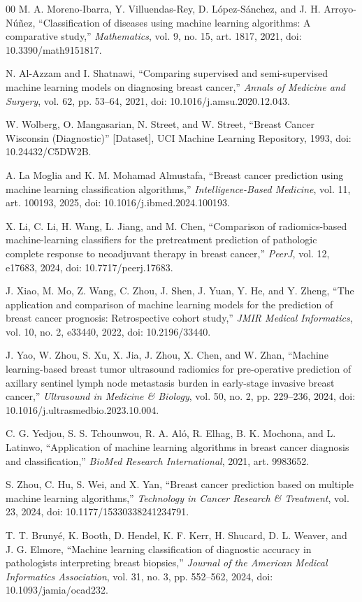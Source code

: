 \documentclass[conference]{IEEEtran}
\begin{document}
\begin{thebibliography}{00}
 M. A. Moreno-Ibarra, Y. Villuendas-Rey, D. L\'opez-S\'anchez, and J. H. Arroyo-N\'u\~nez, ``Classification of diseases using machine learning algorithms: A comparative study,'' \emph{Mathematics}, vol. 9, no. 15, art. 1817, 2021, doi: 10.3390/math9151817.

 N. Al-Azzam and I. Shatnawi, ``Comparing supervised and semi-supervised machine learning models on diagnosing breast cancer,'' \emph{Annals of Medicine and Surgery}, vol. 62, pp. 53--64, 2021, doi: 10.1016/j.amsu.2020.12.043.

 W. Wolberg, O. Mangasarian, N. Street, and W. Street, ``Breast Cancer Wisconsin (Diagnostic)'' [Dataset], UCI Machine Learning Repository, 1993, doi: 10.24432/C5DW2B.

 A. La Moglia and K. M. Mohamad Almustafa, ``Breast cancer prediction using machine learning classification algorithms,'' \emph{Intelligence-Based Medicine}, vol. 11, art. 100193, 2025, doi: 10.1016/j.ibmed.2024.100193.

 X. Li, C. Li, H. Wang, L. Jiang, and M. Chen, ``Comparison of radiomics-based machine-learning classifiers for the pretreatment prediction of pathologic complete response to neoadjuvant therapy in breast cancer,'' \emph{PeerJ}, vol. 12, e17683, 2024, doi: 10.7717/peerj.17683.

 J. Xiao, M. Mo, Z. Wang, C. Zhou, J. Shen, J. Yuan, Y. He, and Y. Zheng, ``The application and comparison of machine learning models for the prediction of breast cancer prognosis: Retrospective cohort study,'' \emph{JMIR Medical Informatics}, vol. 10, no. 2, e33440, 2022, doi: 10.2196/33440.

 J. Yao, W. Zhou, S. Xu, X. Jia, J. Zhou, X. Chen, and W. Zhan, ``Machine learning-based breast tumor ultrasound radiomics for pre-operative prediction of axillary sentinel lymph node metastasis burden in early-stage invasive breast cancer,'' \emph{Ultrasound in Medicine \& Biology}, vol. 50, no. 2, pp. 229--236, 2024, doi: 10.1016/j.ultrasmedbio.2023.10.004.

 C. G. Yedjou, S. S. Tchounwou, R. A. Al\'o, R. Elhag, B. K. Mochona, and L. Latinwo, ``Application of machine learning algorithms in breast cancer diagnosis and classification,'' \emph{BioMed Research International}, 2021, art. 9983652.

 S. Zhou, C. Hu, S. Wei, and X. Yan, ``Breast cancer prediction based on multiple machine learning algorithms,'' \emph{Technology in Cancer Research \& Treatment}, vol. 23, 2024, doi: 10.1177/15330338241234791.

 T. T. Bruny\'e, K. Booth, D. Hendel, K. F. Kerr, H. Shucard, D. L. Weaver, and J. G. Elmore, ``Machine learning classification of diagnostic accuracy in pathologists interpreting breast biopsies,'' \emph{Journal of the American Medical Informatics Association}, vol. 31, no. 3, pp. 552--562, 2024, doi: 10.1093/jamia/ocad232.

\end{thebibliography}
\end{document}
